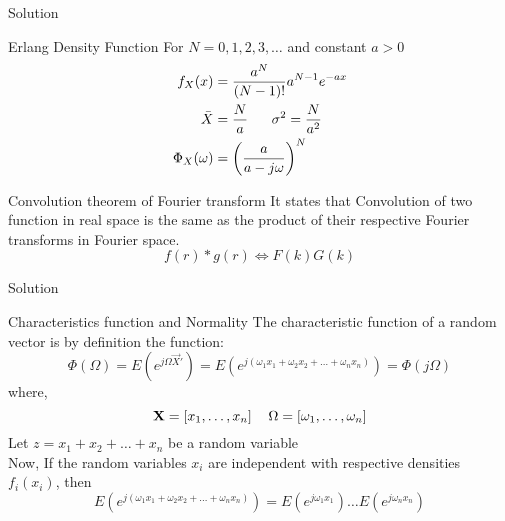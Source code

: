 \documentclass{beamer}
\begin{document}
\begin{frame}{Solution}
    \begin{alertblock}{Erlang Density Function}
        For $N=0,1,2,3,\ldots$  and constant $a>0$
        \begin{align}
            f_X(x) &= \frac{a^N}{(N-1)!}a^{N-1}e^{-ax}\\
            \bar{X} &=\frac{N}{a} \hspace*{17pt} \sigma^2 =\frac{N}{a^2}\\
            \Phi_X(\omega) &= \left(\frac{a}{a-j\omega}\right)^N
        \end{align}
    \end{alertblock}
    \begin{alertblock}{Convolution theorem of Fourier transform}
        It states that Convolution of two function in real space is the same as the product of their respective Fourier transforms in Fourier space.
        \begin{equation}
            f(r)*g(r) \Leftrightarrow F(k)G(k)
        \end{equation}
    \end{alertblock}
\end{frame}
\begin{frame}{Solution}
    \begin{alertblock}{Characteristics function and Normality}
        The characteristic function of a random vector is by definition the function:
        \begin{equation}
            \Phi(\Omega) = E(e^{j\Omega \vec{X}'}) = E(e^{j(\omega_1x_1+\omega_2x_2+\ldots+\omega_n x_n)}) = \Phi(j\Omega)
        \end{equation}
        where,
        \begin{equation}
            \vec{X} = [x_1,\dots,x_n] \hspace*{12pt} \Omega = [\omega_1,\ldots,\omega_n]
        \end{equation}
        Let $z=x_1+x_2+\ldots+x_n$ be a random variable\\
        Now, If the random variables $x_i$ are independent with respective densities $f_i(x_i)$, then
        \begin{equation}
            E(e^{j(\omega_1x_1+\omega_2x_2+\ldots+\omega_n x_n)}) = E(e^{j\omega_1x_1})\ldots E(e^{j\omega_nx_n})
        \end{equation}
    \end{alertblock}
\end{frame}
\end{document}
